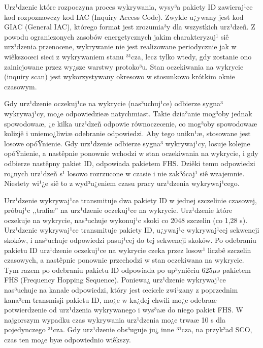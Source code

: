 Urz¹dzenie które rozpoczyna proces wykrywania, wysy³a pakiety ID
zawieraj¹ce kod rozpoznawczy kod IAC (Inquiry Access Code). Zwykle
u¿ywany jest kod GIAC (General IAC), którego format jest zrozumia³y
dla wszystkich urz¹dzeñ. Z powodu ograniczonych zasobów
energetycznych jakim charakteryzuj¹ siê urz¹dzenia przenoœne,
wykrywanie nie jest realizowane periodycznie jak w wiêkszoœci sieci
z wykrywaniem stanu ³¹cza, lecz tylko wtedy, gdy zostanie ono
zainicjowane przez wy¿sze warstwy protoko³u. Stan oczekiwania na
wykrycie (inquiry scan) jest wykorzystywany okresowo w stosunkowo
krótkim oknie czasowym.

Gdy urz¹dzenie oczekuj¹ce na wykrycie (nas³uchuj¹ce) odbierze sygna³
wykrywaj¹cy, mo¿e odpowiedzieæ natychmiast. Takie dzia³anie mog³oby
jednak spowodowaæ, ¿e kilka urz¹dzeñ odpowie równoczeœnie, co
mog³oby spowodowaæ kolizjê i uniemo¿liwiæ odebranie odpowiedzi. Aby
tego unikn¹æ, stosowane jest losowe opóŸnienie. Gdy urz¹dzenie
odbierze sygna³ wykrywaj¹cy, losuje kolejne opóŸnienie,
 a nastêpnie ponownie wchodzi w stan oczekiwania na
wykrycie, i gdy odbierze nastêpny pakiet ID, odpowiada pakietem FHS.
Dziêki temu odpowiedzi ro¿nych urz¹dzeñ s¹ losowo rozrzucone w
czasie i nie zak³ócaj¹ siê wzajemnie. Niestety wi¹¿e siê to z
wyd³u¿eniem czasu pracy urz¹dzenia wykrywaj¹cego.

Urz¹dzenie wykrywaj¹ce transmituje dwa pakiety ID w jednej
szczelinie czasowej, próbuj¹c ,,trafiæ'' na urz¹dzenie oczekuj¹ce na
wykrycie. Urz¹dzenie które oczekuje na wykrycie, nas³uchuje
wykonuj¹c skoki co 2048 szczelin (co 1,28 s). Urz¹dzenie wykrywaj¹ce
transmituje pakiety ID, u¿ywaj¹c wykrywaj¹cej sekwencji skoków, i
nas³uchuje odpowiedzi pasuj¹cej do tej sekwencji skoków. Po
odebraniu pakietu ID urz¹dzenie oczekuj¹ce na wykrycie czeka przez
losow¹ liczbê szczelin czasowych, a nastêpnie ponownie przechodzi w
stan oczekiwana na wykrycie. Tym razem po odebraniu pakietu ID
odpowiada po up³yniêciu $625 \mu s$ pakietem FHS (Frequency Hopping
Sequence). Poniewa¿ urz¹dzenie wykrywaj¹ce nas³uchuje na kanale
odpowiedzi, który jest œciœle zwi¹zany z poprzednim kana³em
transmisji pakietu ID, mo¿e w ka¿dej chwili mo¿e odebraæ
potwierdzenie od urz¹dzenia wykrywanego i wys³aæ do niego pakiet
FHS. W najgorszym wypadku czas wykrywania urz¹dzenia mo¿e trwaæ 10 s
dla pojedynczego ³¹cza. Gdy urz¹dzenie obs³uguje ju¿ inne ³¹cza, na
przyk³ad SCO, czas ten mo¿e byæ odpowiednio wiêkszy.

